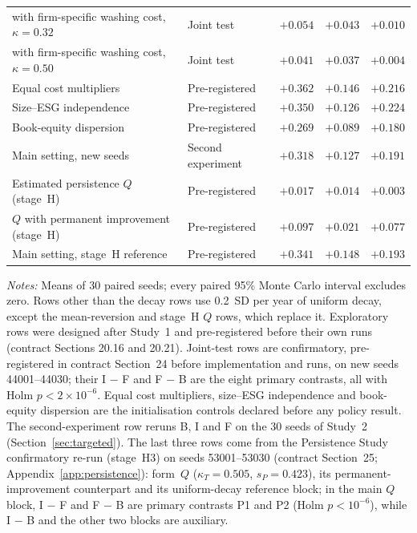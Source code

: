 \documentclass[11pt]{article}
\begin{document}
\begin{table}[h]
\begin{threeparttable}
\begin{tabular}{@{}llrrr@{}}
\quad with firm-specific washing cost, $\kappa = 0.32$ & Joint test & $+0.054$ & $+0.043$ & $+0.010$ \\
\quad with firm-specific washing cost, $\kappa = 0.50$ & Joint test & $+0.041$ & $+0.037$ & $+0.004$ \\
Equal cost multipliers & Pre-registered & $+0.362$ & $+0.146$ & $+0.216$ \\
Size--ESG independence & Pre-registered & $+0.350$ & $+0.126$ & $+0.224$ \\
Book-equity dispersion & Pre-registered & $+0.269$ & $+0.089$ & $+0.180$ \\
Main setting, new seeds & Second experiment & $+0.318$ & $+0.127$ & $+0.191$ \\
Estimated persistence $Q$ (stage~H) & Pre-registered & $+0.017$ & $+0.014$ & $+0.003$ \\
\quad $Q$ with permanent improvement (stage~H) & Pre-registered & $+0.097$ & $+0.021$ & $+0.077$ \\
Main setting, stage~H reference & Pre-registered & $+0.341$ & $+0.148$ & $+0.193$ \\
\bottomrule
\end{tabular}
\begin{tablenotes}[flushleft]\footnotesize
\item \textit{Notes:} Means of 30 paired seeds; every paired 95\% Monte Carlo interval excludes zero. Rows other than the decay rows use 0.2~SD per year of uniform decay, except the mean-reversion and stage~H $Q$ rows, which replace it. Exploratory rows were designed after Study~1 and pre-registered before their own runs (contract Sections 20.16 and 20.21). Joint-test rows are confirmatory, pre-registered in contract Section~24 before implementation and runs, on new seeds 44001--44030; their I $-$ F and F $-$ B are the eight primary contrasts, all with Holm $p < 2\times10^{-6}$. Equal cost multipliers, size--ESG independence and book-equity dispersion are the initialisation controls declared before any policy result. The second-experiment row reruns B, I and F on the 30 seeds of Study~2 (Section~\ref{sec:targeted}). The last three rows come from the Persistence Study confirmatory re-run (stage~H3) on seeds 53001--53030 (contract Section~25; Appendix~\ref{app:persistence}): form~$Q$ ($\kappa_T = 0.505$, $s_P = 0.423$), its permanent-improvement counterpart and its uniform-decay reference block; in the main $Q$ block, I $-$ F and F $-$ B are primary contrasts P1 and P2 (Holm $p < 10^{-6}$), while I $-$ B and the other two blocks are auxiliary.
\end{tablenotes}
\end{threeparttable}
\end{table}
\end{document}
